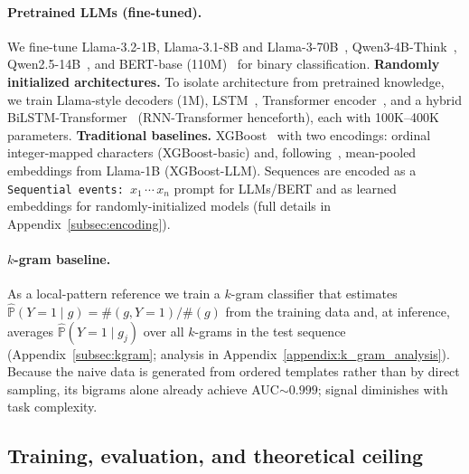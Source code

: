 \documentclass{article}
\theoremstyle{plain}
\theoremstyle{definition}
\theoremstyle{remark}
\begin{document}
\paragraph{Pretrained LLMs (fine-tuned).} We fine-tune Llama-3.2-1B, Llama-3.1-8B and Llama-3-70B~\citep{touvron2023llama, grattafiori2024llama3}, Qwen3-4B-Think~\citep{bai2023qwen}, Qwen2.5-14B~\citep{qwen2.5, qwen2}, and BERT-base (110M)~\citep{devlin2019bert} for binary classification. \textbf{Randomly initialized architectures.} To isolate architecture from pretrained knowledge, we train Llama-style decoders (1M), LSTM~\citep{hochreiter1997lstm}, Transformer encoder~\citep{vaswani2017attention}, and a hybrid BiLSTM-Transformer~\citep{graves2005bilstm} (RNN-Transformer henceforth), each with 100K--400K parameters. \textbf{Traditional baselines.} XGBoost~\citep{chen2016xgboost} with two encodings: ordinal integer-mapped characters (XGBoost-basic) and, following~\citet{XGBoost_LLMs, XGBoost_LLMs_HF}, mean-pooled embeddings from Llama-1B (XGBoost-LLM). Sequences are encoded as a \texttt{Sequential events: $x_1\,\cdots\,x_n$} prompt for LLMs/BERT and as learned embeddings for randomly-initialized models (full details in Appendix~\ref{subsec:encoding}).

\paragraph{$k$-gram baseline.} As a local-pattern reference we train a $k$-gram classifier that estimates $\hat{\mathbb{P}}(Y=1\mid g)=\#(g,Y=1)/\#(g)$ from the training data and, at inference, averages $\hat{\mathbb{P}}(Y=1\mid g_j)$ over all $k$-grams in the test sequence (Appendix~\ref{subsec:kgram}; analysis in Appendix~\ref{appendix:k_gram_analysis}). Because the naive data is generated from ordered templates rather than by direct sampling, its bigrams alone already achieve AUC${\sim}0.999$; signal diminishes with task complexity.

\subsection{Training, evaluation, and theoretical ceiling}
\label{subsec:training}
\label{subsec:evaluation}
\end{document}
